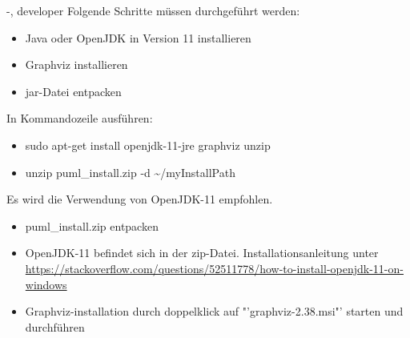 \documentclass[twoside]{report}
\begin{document}
\begin{shownto}{-, developer}
Folgende Schritte müssen durchgeführt werden:
\begin{itemize}
\item Java oder OpenJDK in Version 11 installieren
\item Graphviz installieren
\item jar-Datei entpacken
\end{itemize}
\nsecend

In Kommandozeile ausführen:
\begin{itemize}
\item sudo apt-get install openjdk-11-jre graphviz unzip
\item unzip puml\_install.zip -d \textasciitilde{}/myInstallPath
\end{itemize}
\nsecend

Es wird die Verwendung von OpenJDK-11 empfohlen.
\begin{itemize}
\item puml\_install.zip entpacken
\item OpenJDK-11 befindet sich in der zip-Datei. Installationsanleitung unter \url{https://stackoverflow.com/questions/52511778/how-to-install-openjdk-11-on-windows}
\item Graphviz-installation durch doppelklick auf "'graphviz-2.38.msi"' starten und durchführen 
\end{itemize}
\nsecend

\nsecend %
\nsecend %

\end{shownto} %
\end{document}
